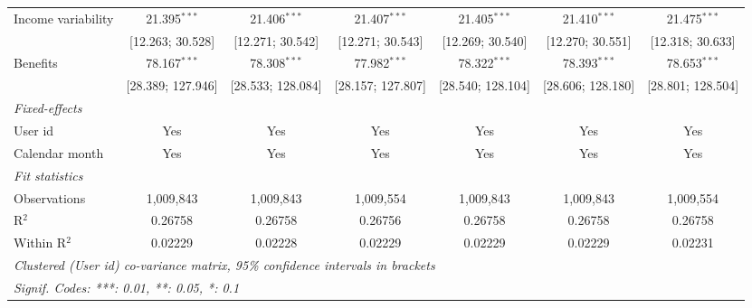 \begin{table}[htbp]
\begin{threeparttable}[b]
\begin{tabular}{lcccccc}
         Income variability             & 21.395$^{***}$       & 21.406$^{***}$       & 21.407$^{***}$       & 21.405$^{***}$       & 21.410$^{***}$       & 21.475$^{***}$\\   
                                        & [12.263; 30.528]     & [12.271; 30.542]     & [12.271; 30.543]     & [12.269; 30.540]     & [12.270; 30.551]     & [12.318; 30.633]\\   
         Benefits                       & 78.167$^{***}$       & 78.308$^{***}$       & 77.982$^{***}$       & 78.322$^{***}$       & 78.393$^{***}$       & 78.653$^{***}$\\   
                                        & [28.389; 127.946]    & [28.533; 128.084]    & [28.157; 127.807]    & [28.540; 128.104]    & [28.606; 128.180]    & [28.801; 128.504]\\   
         \midrule
         \emph{Fixed-effects}\\
         User id                        & Yes                  & Yes                  & Yes                  & Yes                  & Yes                  & Yes\\  
         Calendar month                 & Yes                  & Yes                  & Yes                  & Yes                  & Yes                  & Yes\\  
         \midrule
         \emph{Fit statistics}\\
         Observations                   & 1,009,843            & 1,009,843            & 1,009,554            & 1,009,843            & 1,009,843            & 1,009,554\\  
         R$^2$                          & 0.26758              & 0.26758              & 0.26756              & 0.26758              & 0.26758              & 0.26758\\  
         Within R$^2$                   & 0.02229              & 0.02228              & 0.02229              & 0.02229              & 0.02229              & 0.02231\\  
         \midrule \midrule
         \multicolumn{7}{l}{\emph{Clustered (User id) co-variance matrix, 95\% confidence intervals in brackets}}\\
         \multicolumn{7}{l}{\emph{Signif. Codes: ***: 0.01, **: 0.05, *: 0.1}}\\
      \end{tabular}
   \end{threeparttable}
\end{table}


